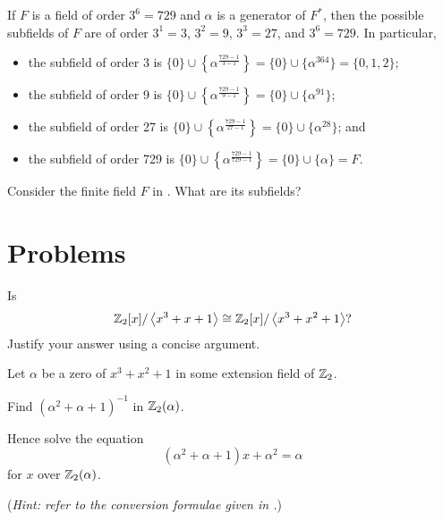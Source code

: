 \begin{example}
    If $F$ is a field of order $3^6 = 729$ and $\alpha$ is a generator of $F^\ast$, then the possible subfields of $F$ are of order $3^1 = 3$, $3^2 = 9$, $3^3 = 27$, and $3^6 = 729$. In particular,
    \begin{itemize}
        \item the subfield of order 3 is $\{0\} \cup \left\{\alpha^{\frac{729-1}{3-1}}\right\} = \{0\} \cup \{\alpha^{364}\} = \{0,1,2\}$;
        \item the subfield of order 9 is $\{0\} \cup \left\{\alpha^{\frac{729-1}{9-1}}\right\} = \{0\} \cup \{\alpha^{91}\}$;
        \item the subfield of order 27 is $\{0\} \cup \left\{\alpha^{\frac{729-1}{27-1}}\right\} = \{0\} \cup \{\alpha^{28}\}$; and
        \item the subfield of order 729 is $\{0\} \cup \left\{\alpha^{\frac{729-1}{729-1}}\right\} = \{0\} \cup \{\alpha\} = F$.
    \end{itemize}
\end{example}

\begin{exercise}
    Consider the finite field $F$ in . What are its subfields?
\end{exercise}

\newpage

\section{Problems}
\begin{problem}
    Is
    \[
        \mathbb{Z}_2[x]/\left\langle x^3+x+1\right\rangle \cong \mathbb{Z}_2[x]/\left\langle x^3+x^2+1\right\rangle?
    \]
    Justify your answer using a concise argument.
\end{problem}

\begin{problem}
    Let $\alpha$ be a zero of $x^3 + x^2 + 1$ in some extension field of $\mathbb{Z}_2$.
    \begin{partquestions}{\roman*}
        \item Find $(\alpha^2 + \alpha + 1)^{-1}$ in $\mathbb{Z}_2(\alpha)$.
        \item Hence solve the equation
        \[
            (\alpha^2 + \alpha + 1)x + \alpha^2 = \alpha
        \]
        for $x$ over $\mathbb{Z}_2(\alpha)$.
    \end{partquestions}
    (\textit{Hint: refer to the conversion formulae given in .})
\end{problem}


